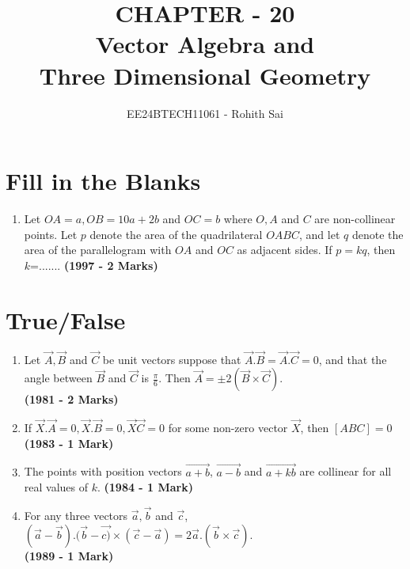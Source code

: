 \documentclass[journal,12pt,twocolumn]{IEEEtran}
\theoremstyle{remark}
\begin{document}

\vspace{3cm}

\title{CHAPTER - 20\\Vector Algebra and\\Three Dimensional Geometry}
\author{EE24BTECH11061 - Rohith Sai}
\maketitle
\newpage
\bigskip

\renewcommand{\thefigure}{\theenumi}
\renewcommand{\thetable}{\theenumi}

\section{Fill in the Blanks}
\begin{enumerate}
\item Let $OA=a, OB = 10a + 2b$ and $OC =b$ where $O, A$ and $C$ are non-collinear points. Let $p$ denote the area of the quadrilateral $OABC$, and let $q$ denote the area of the parallelogram with $OA$ and $OC$ as adjacent sides. If $p=kq$, then $k$=.......
\hfill{\textbf{(1997 - 2 Marks)}}
\end{enumerate}

\section{True/False}
\begin{enumerate}
\item Let $\vec{A}, \vec{B}$ and $\vec{C}$ be unit vectors suppose that $\vec{A}.\vec{B} = \vec{A}.\vec{C}=0$, and that the angle between $\vec{B}$ and $\vec{C}$ is $\frac{\pi}{6}$. Then $\vec{A}=\pm2(\vec{B}\times\vec{C})$.\\
\hfill {\textbf{(1981 - 2 Marks)}}

\item If $\vec{X}.\vec{A}=0, \vec{X}.\vec{B}=0, \vec{X}\vec{C}=0$ for some non-zero vector $\vec{X}$, then $[A B C]=0$
\hfill \textbf{(1983 - 1 Mark)}

\item The points with position vectors $\vec{a+b}$, $\vec{a-b}$ and $\vec{a+kb}$ are collinear for all real values of $k$.
\hfill{\textbf{(1984 - 1 Mark)}}

\item For any three vectors $\vec{a}, \vec{b}$ and $\vec{c}$, $(\vec{a}-\vec{b}).{(\vec{b}-\vec{c)}\times(\vec{c}-\vec{a})} = 2\vec{a}.(\vec{b}\times\vec{c}).$\\
\hfill{\textbf{(1989 - 1 Mark)}}
\end{enumerate}
\end{document}
